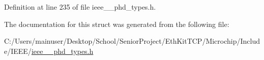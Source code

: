 Definition at line 235 of file ieee\+\_\+\_\+phd\+\_\+types.\+h.



The documentation for this struct was generated from the following file\+:\begin{DoxyCompactItemize}
\item 
C\+:/\+Users/mainuser/\+Desktop/\+School/\+Senior\+Project/\+Eth\+Kit\+T\+C\+P/\+Microchip/\+Include/\+I\+E\+E\+E/\hyperlink{ieee__11073__phd__types_8h}{ieee\+\_\+\_\+phd\+\_\+types.\+h}\end{DoxyCompactItemize}
